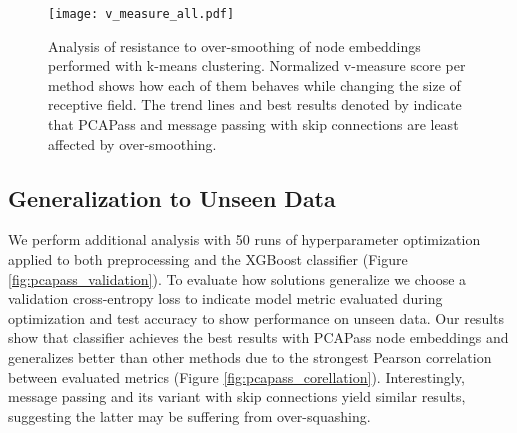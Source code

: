 \documentclass[nohyperref]{article}
\theoremstyle{plain}
\theoremstyle{definition}
\theoremstyle{remark}
\begin{document}
\begin{figure*}[!hbt]
    \vskip 0.2in
    \begin{center}
    \centerline{\texttt{[image: v\_measure\_all.pdf]}}
    \caption{Analysis of resistance to over-smoothing of node embeddings performed with k-means clustering. Normalized v-measure score per method shows how each of them behaves while changing the size of receptive field. The trend lines and best results denoted by \textcolor{black}{\large} indicate that PCAPass and message passing with skip connections are least affected by over-smoothing.}
    \label{fig:vms}
    \end{center}
    \vskip 0.2in
\end{figure*}

\subsection{Generalization to Unseen Data}
We perform additional analysis with 50 runs of hyperparameter optimization applied to both preprocessing and the XGBoost classifier (Figure \ref{fig:pcapass_validation}). 
To evaluate how solutions generalize we choose a validation cross-entropy loss to indicate model metric evaluated during optimization and test accuracy to show performance on unseen data. 
Our results show that classifier achieves the best results with PCAPass node embeddings and generalizes better than other methods due to the strongest Pearson correlation between evaluated metrics (Figure \ref{fig:pcapass_corellation}).
Interestingly, message passing and its variant with skip connections yield similar results, suggesting the latter may be suffering from over-squashing.
\end{document}
